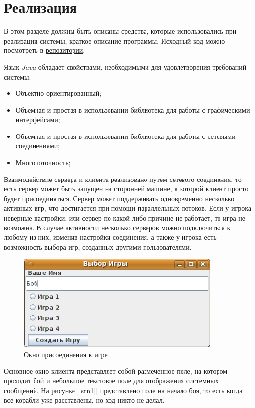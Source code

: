 ﻿\section{Реализация}
В этом разделе должны быть описаны средства, которые использовались при реализации системы, краткое описание программы. Исходный код можно посмотреть в \href{https://github.com/sanek701/SeaGame/tarball/master}{репозитории}.

Язык $Java$ обладает свойствами, необходимыми для удовлетворения требований системы:
		\begin{itemize}		
			\item Объектно-ориентированный;
			\item Объемная и простая в использовании библиотека для работы с графическими интерфейсами;
			\item Объемная и простая в использовании библиотека для работы с сетевыми соединениями;
			\item Многопоточность;
		\end{itemize}

Взаимодействие сервера и клиента реализовано путем сетевого соединения, то есть сервер может быть запущен на сторонней машине, к которой клиент просто будет присоединяться. Сервер может поддерживать одновременно несколько активных игр, что достигается при помощи параллельных потоков. Если у игрока неверные настройки, или сервер по какой-либо причине не работает, то игра не возможна. В случае активности несколько серверов можно подключиться к любому из них, изменив настройки соединения, а также у игрока есть возможность выбора игр, созданных другими пользователями. 
\begin{figure}[ht]
\centering
\includegraphics[width=10cm]{images/srn2.png}
\caption{Окно присоединения к игре}
\label{srn2}
\end{figure}

Основное окно клиента представляет собой размеченное поле, на котором проходит бой и небольшое текстовое поле для отображения системных сообщений. На рисунке [\ref{srn1}] представлено поле на начало боя, то есть когда все корабли уже расставлены, но ход никто не делал.

